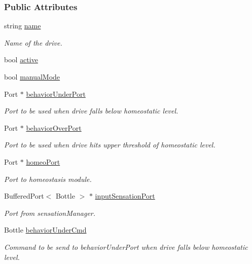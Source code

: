 \subsubsection*{Public Attributes}
\begin{DoxyCompactItemize}
\item 
string \hyperlink{group__allostaticController_abd23f5c821ac78b4bfd55377f73d6d94}{name}
\begin{DoxyCompactList}\small\item\em Name of the drive. \end{DoxyCompactList}\item 
bool \hyperlink{group__allostaticController_aeb90236386ea512b6100583b7d0c409f}{active}
\item 
bool \hyperlink{group__allostaticController_a6c346cb58e92a490c784e1e637529d50}{manual\+Mode}
\item 
Port $\ast$ \hyperlink{group__allostaticController_a1cbe962d96a15bf82f7e57a11ab3c1c0}{behavior\+Under\+Port}
\begin{DoxyCompactList}\small\item\em Port to be used when drive falls below homeostatic level. \end{DoxyCompactList}\item 
Port $\ast$ \hyperlink{group__allostaticController_a0ae7b5cdd6d2ef10fc83a0b426019615}{behavior\+Over\+Port}
\begin{DoxyCompactList}\small\item\em Port to be used when drive hits upper threshold of homeostatic level. \end{DoxyCompactList}\item 
Port $\ast$ \hyperlink{group__allostaticController_a1f2c6a7f4f35d01061381569f98b2a1e}{homeo\+Port}
\begin{DoxyCompactList}\small\item\em Port to homeostasis module. \end{DoxyCompactList}\item 
Buffered\+Port$<$ Bottle $>$ $\ast$ \hyperlink{group__allostaticController_a09a6b2f056f2b4517e6a338f499fa9c1}{input\+Sensation\+Port}
\begin{DoxyCompactList}\small\item\em Port from sensation\+Manager. \end{DoxyCompactList}\item 
Bottle \hyperlink{group__allostaticController_abae41498adb72667a5e884242fbccff6}{behavior\+Under\+Cmd}
\begin{DoxyCompactList}\small\item\em Command to be send to behavior\+Under\+Port when drive falls below homeostatic level. \end{DoxyCompactList}\item 

\end{DoxyCompactItemize}
